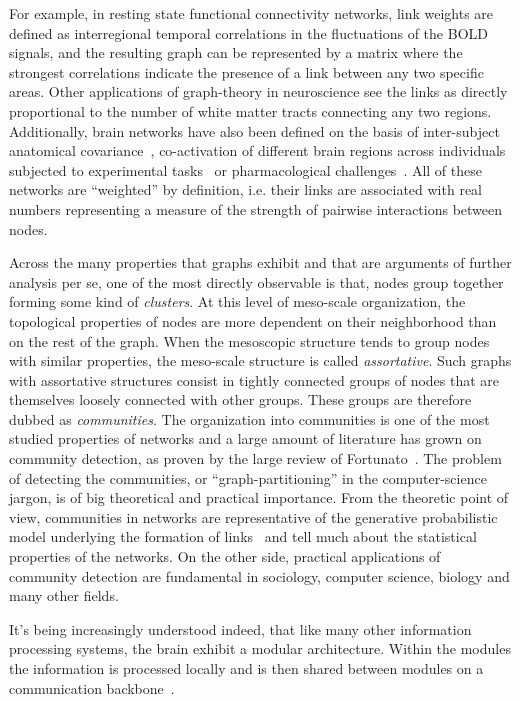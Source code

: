 For example, in resting state functional connectivity networks, link weights are defined as interregional temporal correlations in the fluctuations of the BOLD signals, and the resulting graph can be represented by a matrix where the strongest correlations indicate the presence of a link between any two specific areas.
Other applications of graph-theory in neuroscience see the links as directly proportional to the number of white matter tracts connecting any two regions.
Additionally, brain networks have also been defined on the basis of inter-subject anatomical covariance~\cite{Evans2013}, co-activation of different brain regions across individuals subjected to experimental tasks~\cite{crossley2013a} or pharmacological challenges~\cite{Schwarz2007,schwarz2008}.
All of these networks are ``weighted'' by definition, i.e. their links are associated with real numbers representing a measure of the strength of pairwise interactions between nodes. 

Across the many properties that graphs exhibit and that are arguments of further analysis per se, one of the most directly observable is that, nodes group together forming some kind of \emph{clusters}.
At this level of meso-scale organization, the topological properties of nodes are more dependent on their neighborhood than on the rest of the graph. When the mesoscopic structure tends to group nodes with similar properties, the meso-scale structure is called \emph{assortative}. Such graphs with assortative structures consist in tightly connected groups of nodes that are themselves loosely connected with other groups. These groups are therefore dubbed as \emph{communities}. 
\bigbreak
The organization into communities is one of the most studied properties of networks and a large amount of literature has grown on community detection, as proven by the large review of Fortunato~\cite{fortunato2010}.
The problem of detecting the communities, or ``graph-partitioning'' in the computer-science jargon, is of big theoretical and practical importance.
From the theoretic point of view, communities in networks are representative of the generative probabilistic model underlying the formation of links~\cite{Karrer2011} and tell much about the statistical properties of the networks.
On the other side, practical applications of community detection are fundamental in sociology, computer science, biology and many other fields.

It's being increasingly understood indeed, that like many other information processing systems, the brain exhibit a modular architecture.
Within the modules the information is processed locally and is then shared between modules on a communication backbone~\cite{DeReus2013a,VandenHeuvel2013a}.

